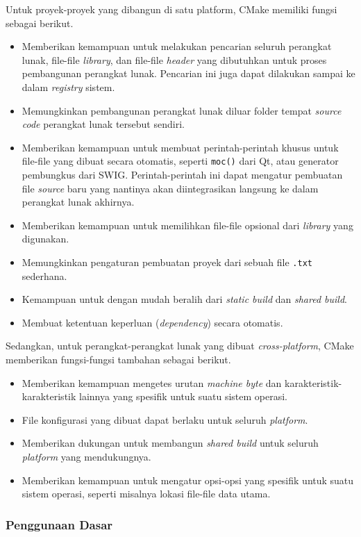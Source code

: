 Untuk proyek-proyek yang dibangun di satu platform, CMake memiliki fungsi sebagai berikut.

\begin{itemize}
	\item Memberikan kemampuan untuk melakukan pencarian seluruh perangkat lunak, file-file \textit{library}, dan file-file \textit{header} yang dibutuhkan untuk proses pembangunan perangkat lunak. Pencarian ini juga dapat dilakukan sampai ke dalam \textit{registry} sistem.
	\item Memungkinkan pembangunan perangkat lunak diluar folder tempat \textit{source code} perangkat lunak tersebut sendiri.
	\item Memberikan kemampuan untuk membuat perintah-perintah khusus untuk file-file yang dibuat secara otomatis, seperti \verb|moc()| dari Qt, atau generator pembungkus dari SWIG. Perintah-perintah ini dapat mengatur pembuatan file \textit{source} baru yang nantinya akan diintegrasikan langsung ke dalam perangkat lunak akhirnya.
	\item Memberikan kemampuan untuk memilihkan file-file opsional dari \textit{library} yang digunakan.
	\item Memungkinkan pengaturan pembuatan proyek dari sebuah file \verb|.txt| sederhana.
	\item Kemampuan untuk dengan mudah beralih dari \textit{static build} dan \textit{shared build}.
	\item Membuat ketentuan keperluan (\textit{dependency}) secara otomatis.
\end{itemize}
\noindent
Sedangkan, untuk perangkat-perangkat lunak yang dibuat \textit{cross-platform}, CMake memberikan fungsi-fungsi tambahan sebagai berikut.

\begin{itemize}
	\item Memberikan kemampuan mengetes urutan \textit{machine byte} dan karakteristik-karakteristik lainnya yang spesifik untuk suatu sistem operasi.
	\item File konfigurasi yang dibuat dapat berlaku untuk seluruh \textit{platform}.
	\item Memberikan dukungan untuk membangun \textit{shared build} untuk seluruh \textit{platform} yang mendukungnya.
	\item Memberikan kemampuan untuk mengatur opsi-opsi yang spesifik untuk suatu sistem operasi, seperti misalnya lokasi file-file data utama.
\end{itemize}

\subsubsection{Penggunaan Dasar}
\label{sec:cmodules-CMake-basicusage}

